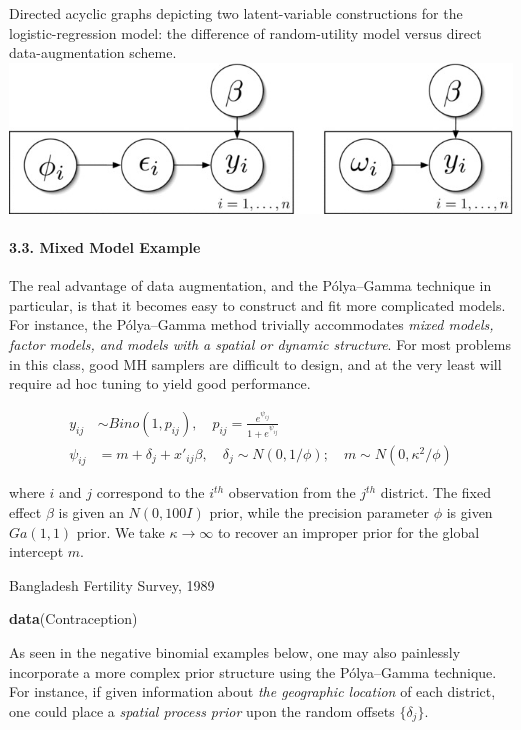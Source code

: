 \documentclass[
]{article}
\newenvironment{Shaded}{\begin{snugshade}}{\end{snugshade}}
\newcommand{\KeywordTok}[1]{\textcolor[rgb]{0.13,0.29,0.53}{\textbf{#1}}}
\newcommand{\NormalTok}[1]{#1}
\begin{document}
Directed acyclic graphs depicting two latent-variable constructions for
the logistic-regression model: the difference of random-utility model
versus direct data-augmentation scheme.
\includegraphics{uasa_a_829001_o_f0001g.jpeg}

\hypertarget{mixed-model-example}{%
\paragraph{3.3. Mixed Model Example}\label{mixed-model-example}}

The real advantage of data augmentation, and the Pólya--Gamma technique
in particular, is that it becomes easy to construct and fit more
complicated models. For instance, the Pólya--Gamma method trivially
accommodates \emph{mixed models, factor models, and models with a
spatial or dynamic structure}. For most problems in this class, good MH
samplers are difficult to design, and at the very least will require ad
hoc tuning to yield good performance.

\[\begin{align}
y_{ij}&\sim Bino(1,p_{ij}),\quad p_{ij}=\frac{e^{\psi_{ij}}}{1+e^{\psi_{ij}}}\\
\psi_{ij}&=m+\delta_j+x'_{ij}\beta,\quad\delta_j\sim N(0,1/\phi);\quad m\sim N(0,\kappa^2/\phi)
\end{align}\]

where \(i\) and \(j\) correspond to the \(i^{th}\) observation from the
\(j^{th}\) district. The fixed effect \(\beta\) is given an
\(N(0, 100I)\) prior, while the precision parameter \(\phi\) is given
\(Ga(1, 1)\) prior. We take \(\kappa\to\infty\) to recover an improper
prior for the global intercept \(m\).

Bangladesh Fertility Survey, 1989

\begin{Shaded}
\begin{Highlighting}[]
\KeywordTok{data}\NormalTok{(Contraception)}
\end{Highlighting}
\end{Shaded}

As seen in the negative binomial examples below, one may also painlessly
incorporate a more complex prior structure using the Pólya--Gamma
technique. For instance, if given information about \emph{the geographic
location} of each district, one could place a \emph{spatial process
prior} upon the random offsets \(\{\delta_j\}\).
\end{document}
